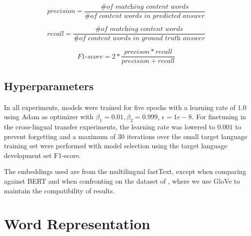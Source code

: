 \begin{equation}
    precision = \frac{\textit{\# of matching content words}}{\textit{\# of content words in predicted answer}}
\label{eq:precision}
\end{equation}


\begin{equation}
    recall = \frac{\textit{\# of matching content words}}{\textit{\# of content words in ground truth answer}}
\label{eq:recall}
\end{equation}


\begin{equation}
    \textit{F1-score} = 2 * \frac{precison * recall}{precision + recall}
\label{eq:f1}
\end{equation}

\subsection{Hyperparameters}
\paragraph{}
In all experiments, models were trained for five epochs with a learning rate of $1.0$ using Adam \citep{kingma2014adam} as optimizer with $\beta_1 = 0.01, \beta_2 = 0.999$, $\epsilon = 1e - 8$. For finetuning in the cross-lingual transfer experiments, the learning rate was lowered to $0.001$ to prevent forgetting and a maximum of $30$ iterations over the small target language training set were performed with model selection using the target language development set F1-score. 

The embeddings used are from the multilingual fastText, except when comparing against BERT and when confronting on the dataset of \cite{levy2017zero}, where we use GloVe to maintain the compatibility of results. 


\section{Word Representation}
